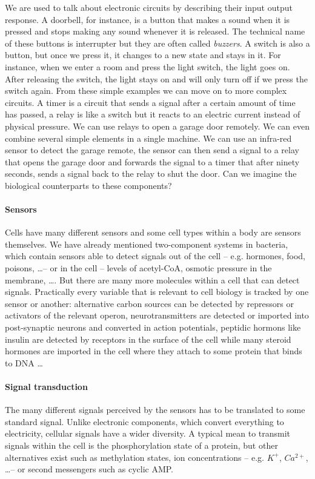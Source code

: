 We are used to talk about electronic circuits by describing their input output response. A doorbell, for instance, is a button that makes a sound when it is pressed and stops making any sound whenever it is released. The technical name of these buttons is interrupter but they are often called \emph{buzzers}. A switch is also a button, but once we press it, it changes to a new state and stays in it. For instance, when we enter a room and press the light switch, the light goes on. After releasing the switch, the light stays on and will only turn off if we press the switch again. From these simple examples we can move on to more complex circuits. A  timer is a circuit that sends a signal after a certain amount of time has passed, a relay is like a switch but it reacts to an electric current instead of physical pressure. We can use relays to open a garage door remotely. We can even combine several simple elements in a single machine. We can use an infra-red sensor to detect the garage remote, the sensor can then send a signal to a relay that opens the garage door and forwards the signal to a timer that after ninety seconds, sends a signal back to the relay to shut the door. Can we imagine the biological counterparts to these components?

\paragraph{Sensors} Cells have many different sensors and some cell types within a body are sensors themselves. We have already mentioned two-component systems in bacteria, which contain sensors able to detect signals out of the cell -- e.g. hormones, food, poisons, \dots -- or in the cell -- levels of acetyl-CoA, osmotic pressure in the membrane, \dots. But there are many more molecules within a cell that can detect signals. Practically every variable that is relevant to cell biology is tracked by one sensor or another: alternative carbon sources can be detected by repressors or activators of the relevant operon, neurotransmitters are detected or imported into post-synaptic neurons  and converted in action potentials, peptidic hormons like insulin are detected by receptors in the surface of the cell while many steroid hormones are imported in the cell where they attach to some protein that binds to DNA \dots 

\paragraph{Signal transduction} The many different signals perceived by the sensors has to be translated to some standard signal. Unlike electronic components, which convert everything to electricity, cellular signals have a wider diversity. A typical mean to transmit signals within the cell is the phosphorylation state of a protein, but other alternatives exist such as methylation states, ion concentrations -- e.g. $K^+$, $Ca^{2+}$, \dots -- or second messengers such as cyclic AMP.
